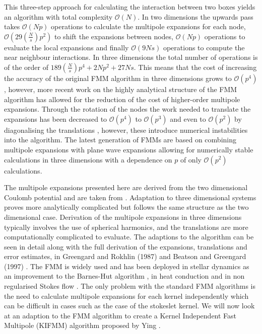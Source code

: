 This three-step approach for calculating the interaction between two boxes yields an algorithm with total complexity $\mathcal{O}(N)$. In two dimensions the upwards pass takes $\mathcal{O}(Np)$ operations to calculate the multipole expansions for each node, $\mathcal{O}(29 \left(\frac{N}{s}\right) p^2)$ to shift the expansions between nodes, $\mathcal{O}(Np)$ operations to evaluate the local expansions and finally $\mathcal{O}(9Ns)$ operations to compute the near neighbour interactions. In three dimensions the total number of operations is of the order of $189\left(\frac{N}{s}\right)p^4 + 2Np^2 + 27Ns$. This means that the cost of increasing the accuracy of the original FMM algorithm in three dimensions grows to $\mathcal{O}(p^4)$, however, more recent work on the highly analytical structure of the FMM algorithm has allowed for the reduction of the cost of higher-order multipole expansions. Through the rotation of the nodes the work needed to translate the expansions has been decreased to $\mathcal{O}(p^4)$ to $\mathcal{O}(p^3)$ \cite{Greengard1997ADimensions,Hrycak1998AnFields} and even to $\mathcal{O}(p^2)$ by diagonalising the translations \cite{Berman2006Grid-MultipoleCalculations,Elliott1996FastAlgorithm}, however, these introduce numerical instabilities into the algorithm. The latest generation of FMMs are based on combining multipole expansions with plane wave expansions \cite{Greengard1997ADimensions,Hrycak1998AnFields} allowing for numerically stable calculations in three dimensions with a dependence on $p$ of only $\mathcal{O}(p^2)$ calculations. 

The multipole expansions presented here are derived from the two dimensional Coulomb potential and are taken from \cite{Beatson,Greengard1987ASimulations}. Adaptation to three dimensional systems proves more analytically complicated but follows the same structure as the two dimensional case. Derivation of the multipole expansions in three dimensions typically involves the use of spherical harmonics, and the translations are more computationally complicated to evaluate. The adaptions to the algorithm can be seen in detail along with the full derivation of the expansions, translations and error estimates, in Greengard and Rokhlin (1987) \cite{Greengard1987ASimulations} and Beatson and Greengard (1997) \cite{Beatson}. The FMM is widely used and has been deployed in stellar dynamics as an improvement to the Barnes-Hut algorithm \cite{Dehnen2014ADynamics}, in heat conduction \cite{Watschinger2021AEquation} and in non regularised Stokes flow \cite{Selmi2007FastComplexity,Tornberg2008}. The only problem with the standard FMM algorithms is the need to calculate multipole expansions for each kernel independently which can be difficult in cases such as the case of the stokeslet kernel. We will now look at an adaption to the FMM algorithm to create a Kernel Independent Fast Multipole (KIFMM) algorithm proposed by Ying \cite{Ying2004,Ying2005}.